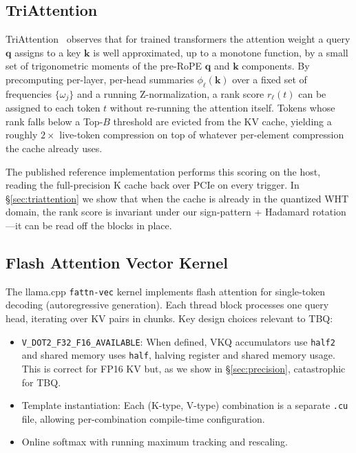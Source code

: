 \documentclass[10pt,twocolumn]{article}
\begin{document}
\subsection{TriAttention}

TriAttention~\cite{triattention2026} observes that for trained transformers the attention weight a query $\mathbf{q}$ assigns to a key $\mathbf{k}$ is well approximated, up to a monotone function, by a small set of trigonometric moments of the pre-RoPE $\mathbf{q}$ and $\mathbf{k}$ components. By precomputing per-layer, per-head summaries $\phi_\ell(\mathbf{k})$ over a fixed set of frequencies $\{\omega_j\}$ and a running Z-normalization, a rank score $r_\ell(t)$ can be assigned to each token $t$ without re-running the attention itself. Tokens whose rank falls below a Top-$B$ threshold are evicted from the KV cache, yielding a roughly $2\times$ live-token compression on top of whatever per-element compression the cache already uses.

The published reference implementation performs this scoring on the host, reading the full-precision K cache back over PCIe on every trigger. In \S\ref{sec:triattention} we show that when the cache is already in the quantized WHT domain, the rank score is invariant under our sign-pattern + Hadamard rotation---it can be read off the blocks in place.

\subsection{Flash Attention Vector Kernel}

The llama.cpp \texttt{fattn-vec} kernel implements flash attention for single-token decoding (autoregressive generation). Each thread block processes one query head, iterating over KV pairs in chunks. Key design choices relevant to TBQ:

\begin{itemize}[leftmargin=*,topsep=2pt,itemsep=1pt]
\item \texttt{V\_DOT2\_F32\_F16\_AVAILABLE}: When defined, VKQ accumulators use \texttt{half2} and shared memory uses \texttt{half}, halving register and shared memory usage. This is correct for FP16 KV but, as we show in \S\ref{sec:precision}, catastrophic for TBQ.
\item Template instantiation: Each (K-type, V-type) combination is a separate \texttt{.cu} file, allowing per-combination compile-time configuration.
\item Online softmax with running maximum tracking and rescaling.
\end{itemize}
\end{document}
